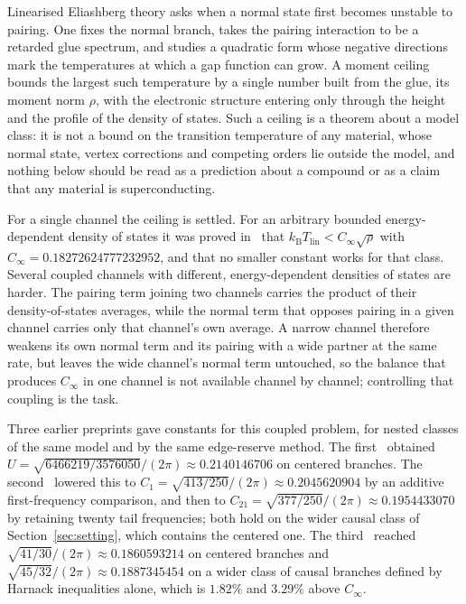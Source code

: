 \documentclass[10pt]{article}
\theoremstyle{remark}
\newcommand{\kB}{k_{\mathrm B}}
\newcommand{\Tlin}{T_{\mathrm{lin}}}
\newcommand{\Cinf}{C_\infty}
\begin{document}
Linearised Eliashberg theory asks when a normal state first becomes unstable to pairing. One fixes the normal branch, takes the pairing interaction to be a retarded glue spectrum, and studies a quadratic form whose negative directions mark the temperatures at which a gap function can grow. A moment ceiling bounds the largest such temperature by a single number built from the glue, its moment norm $\rho$, with the electronic structure entering only through the height and the profile of the density of states. Such a ceiling is a theorem about a model class: it is not a bound on the transition temperature of any material, whose normal state, vertex corrections and competing orders lie outside the model, and nothing below should be read as a prediction about a compound or as a claim that any material is superconducting.

For a single channel the ceiling is settled. For an arbitrary bounded energy-dependent density of states it was proved in~\cite{finite,predecessor} that $\kB\Tlin<\Cinf\sqrt{\rho}$ with $\Cinf=0.18272624777232952$, and that no smaller constant works for that class. Several coupled channels with different, energy-dependent densities of states are harder. The pairing term joining two channels carries the product of their density-of-states averages, while the normal term that opposes pairing in a given channel carries only that channel's own average. A narrow channel therefore weakens its own normal term and its pairing with a wide partner at the same rate, but leaves the wide channel's normal term untouched, so the balance that produces $\Cinf$ in one channel is not available channel by channel; controlling that coupling is the task.

Three earlier preprints gave constants for this coupled problem, for nested classes of the same model and by the same edge-reserve method. The first~\cite{predecessor} obtained $U=\sqrt{6466219/3576050}/(2\pi)\approx0.2140146706$ on centered branches. The second~\cite{optimum} lowered this to $C_1=\sqrt{413/250}/(2\pi)\approx0.2045620904$ by an additive first-frequency comparison, and then to $C_{21}=\sqrt{377/250}/(2\pi)\approx0.1954433070$ by retaining twenty tail frequencies; both hold on the wider causal class of Section~\ref{sec:setting}, which contains the centered one. The third~\cite{finiteenergy} reached $\sqrt{41/30}/(2\pi)\approx0.1860593214$ on centered branches and $\sqrt{45/32}/(2\pi)\approx0.1887345454$ on a wider class of causal branches defined by Harnack inequalities alone, which is $1.82\%$ and $3.29\%$ above $\Cinf$.
\end{document}
